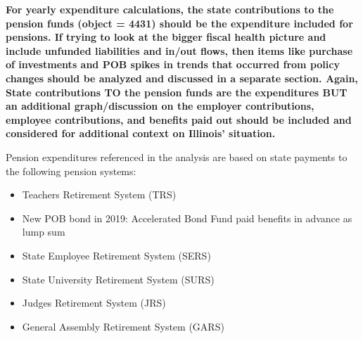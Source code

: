 \documentclass[
  letterpaper,
  DIV=11,
  numbers=noendperiod]{scrreport}
\newenvironment{Shaded}{\begin{snugshade}}{\end{snugshade}}
\newcommand{\AttributeTok}[1]{\textcolor[rgb]{0.40,0.45,0.13}{#1}}
\newcommand{\ConstantTok}[1]{\textcolor[rgb]{0.56,0.35,0.01}{#1}}
\newcommand{\FunctionTok}[1]{\textcolor[rgb]{0.28,0.35,0.67}{#1}}
\newcommand{\NormalTok}[1]{\textcolor[rgb]{0.00,0.23,0.31}{#1}}
\newcommand{\SpecialCharTok}[1]{\textcolor[rgb]{0.37,0.37,0.37}{#1}}
\providecommand{\tightlist}{%
  \setlength{\itemsep}{0pt}\setlength{\parskip}{0pt}}\usepackage{longtable,booktabs,array}
\begin{document}
\begin{Shaded}
\end{Shaded}

\textbf{For yearly expenditure calculations, the state contributions to
the pension funds (object = 4431) should be the expenditure included for
pensions. If trying to look at the bigger fiscal health picture and
include unfunded liabilities and in/out flows, then items like purchase
of investments and POB spikes in trends that occurred from policy
changes should be analyzed and discussed in a separate section. Again,
State contributions TO the pension funds are the expenditures BUT an
additional graph/discussion on the employer contributions, employee
contributions, and benefits paid out should be included and considered
for additional context on Illinois' situation.}

Pension expenditures referenced in the analysis are based on state
payments to the following pension systems:

\begin{itemize}
\tightlist
\item
  Teachers Retirement System (TRS)
\item
  New POB bond in 2019: Accelerated Bond Fund paid benefits in advance
  as lump sum
\item
  State Employee Retirement System (SERS)
\item
  State University Retirement System (SURS)
\item
  Judges Retirement System (JRS)
\item
  General Assembly Retirement System (GARS)
\end{itemize}
\end{document}
